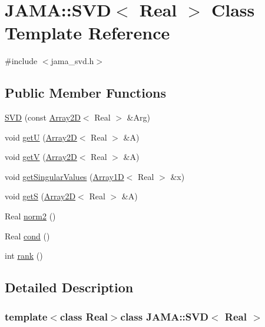 \hypertarget{classJAMA_1_1SVD}{\section{J\-A\-M\-A\-:\-:S\-V\-D$<$ Real $>$ Class Template Reference}
\label{classJAMA_1_1SVD}
}


{\ttfamily \#include $<$jama\-\_\-svd.\-h$>$}

\subsection*{Public Member Functions}
\begin{DoxyCompactItemize}
\item 
\hyperlink{classJAMA_1_1SVD_a4aa25bafe4952f526a18c5aabcb3827e}{S\-V\-D} (const \hyperlink{classTNT_1_1Array2D}{Array2\-D}$<$ Real $>$ \&Arg)
\item 
void \hyperlink{classJAMA_1_1SVD_ae7f5faa245069309abd8b1b630f71ca0}{get\-U} (\hyperlink{classTNT_1_1Array2D}{Array2\-D}$<$ Real $>$ \&A)
\item 
void \hyperlink{classJAMA_1_1SVD_a16c66d5d97354f8b2ec87a4c603a02d6}{get\-V} (\hyperlink{classTNT_1_1Array2D}{Array2\-D}$<$ Real $>$ \&A)
\item 
void \hyperlink{classJAMA_1_1SVD_afbb53e2a3828bd158a45ea87562e7a08}{get\-Singular\-Values} (\hyperlink{classTNT_1_1Array1D}{Array1\-D}$<$ Real $>$ \&x)
\item 
void \hyperlink{classJAMA_1_1SVD_ad25ba091d8385d45bb38e24962cad60a}{get\-S} (\hyperlink{classTNT_1_1Array2D}{Array2\-D}$<$ Real $>$ \&A)
\item 
Real \hyperlink{classJAMA_1_1SVD_a67bc975d69b8eaf4c467641f4df6dcf4}{norm2} ()
\item 
Real \hyperlink{classJAMA_1_1SVD_a70b2e3aaa8720b352d126b30afe7e105}{cond} ()
\item 
int \hyperlink{classJAMA_1_1SVD_a20aa98558dc53170fd899b474f540bd2}{rank} ()
\end{DoxyCompactItemize}


\subsection{Detailed Description}
\subsubsection*{template$<$class Real$>$class J\-A\-M\-A\-::\-S\-V\-D$<$ Real $>$}

